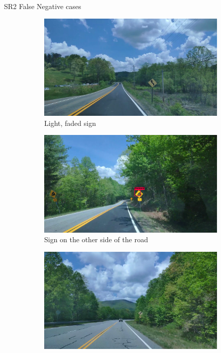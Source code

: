 \documentclass{beamer}
\begin{document}
\begin{frame}{SR2 False Negative cases}
    \begin{figure}
      \begin{center}
        \begin{subfigure}[t]{.49\linewidth}
          \centering
          \includegraphics[width=0.99\linewidth]{figures/examples/sr2/FN/FN_03.png}
          \caption{Light, faded sign}
        \end{subfigure}
        \begin{subfigure}[t]{.49\linewidth}
          \centering
          \includegraphics[width=0.99\linewidth]{figures/examples/sr2/FN/FN_09.png}
          \caption{Sign on the other side of the road}
          \label{fig:othersideFN}
        \end{subfigure}
        \begin{subfigure}[t]{.49\linewidth}
          \centering
          \includegraphics[width=0.99\linewidth]{figures/examples/sr2/FN/FN_07.png}

\end{subfigure}
\end{center}
\end{figure}
\end{frame}
\end{document}
